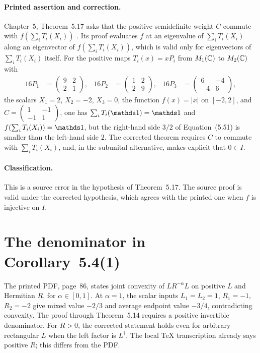 \documentclass{article}
\begin{document}
\paragraph{Printed assertion and correction.}
Chapter~5, Theorem~5.17 asks that the positive semidefinite weight $C$
commute with $f(\sum_iT_i(X_i))$ \cite[Theorem~5.17]{Wolf2012Quantum}. Its
proof evaluates $f$ at an eigenvalue of $\sum_iT_i(X_i)$ along an eigenvector
of $f(\sum_iT_i(X_i))$, which is valid only for eigenvectors of
$\sum_iT_i(X_i)$ itself. For the positive maps $T_i(x)=xP_i$ from $M_{1}(\mathbb{C})$ to
$M_{2}(\mathbb{C})$ with
\begin{align}
    16P_1&=\begin{pmatrix}9&2\\2&1\end{pmatrix},
    &
    16P_2&=\begin{pmatrix}1&2\\2&9\end{pmatrix},
    &
    16P_3&=\begin{pmatrix}6&-4\\-4&6\end{pmatrix},
    \label{eq:wolf_lecture_notes_errata_thm517_weights}
\end{align}
the scalars $X_1=2$, $X_2=-2$, $X_3=0$, the function $f(x)=|x|$ on $[-2,2]$,
and $C=\left(\begin{smallmatrix}1&-1\\-1&1\end{smallmatrix}\right)$, one has
$\sum_iT_i(\Id)=\Id$ and $f(\sum_iT_i(X_i))=\Id$, but the right-hand side
$3/2$ of Equation~(5.51) is smaller than the left-hand side $2$. The corrected
theorem requires $C$ to commute with $\sum_iT_i(X_i)$, and, in the subunital
alternative, makes explicit that $0\in I$.

\paragraph{Classification.}
This is a source error in the hypothesis of Theorem~5.17. The source proof is
valid under the corrected hypothesis, which agrees with the printed one when
$f$ is injective on $I$.

\section{The denominator in Corollary~5.4(1)}

The printed PDF, page~86, states joint convexity of $LR^{-\alpha}L$ on
positive $L$ and Hermitian $R$, for $\alpha\in[0,1]$.
At $\alpha=1$, the scalar inputs $L_1=L_2=1$, $R_1=-1$, $R_2=-2$ give
mixed value $-2/3$ and average endpoint value $-3/4$, contradicting convexity.
The proof through Theorem~5.14 requires a positive invertible denominator.
For $R>0$, the corrected statement holds even for arbitrary rectangular $L$
when the left factor is $L^\dagger$. The local TeX transcription already says
positive $R$; this differs from the PDF.
\end{document}
